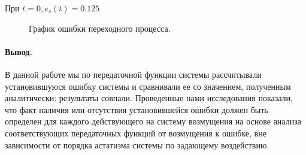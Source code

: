 \documentclass[a4paper, 11pt]{article}
\begin{document}
\normalsize{При $t=0, e_s(t)=0.125$}

\begin{figure}[h]
    \caption{График ошибки переходного процесса.}
    \label{tree}
\end{figure}
\newpage
\paragraph{Вывод.} В данной работе мы по передаточной функции системы рассчитывали установившуюся ошибку системы и сравнивали ее со значением, полученным аналитически: результаты совпали. Проведенные нами исследования показали, что факт наличия или отсутствия установившейся ошибки должен быть определен для каждого действующего на систему возмущения на основе анализа соответствующих передаточных функций от возмущения к ошибке, вне зависимости от порядка астатизма системы по задающему воздействию.
\end{document}
